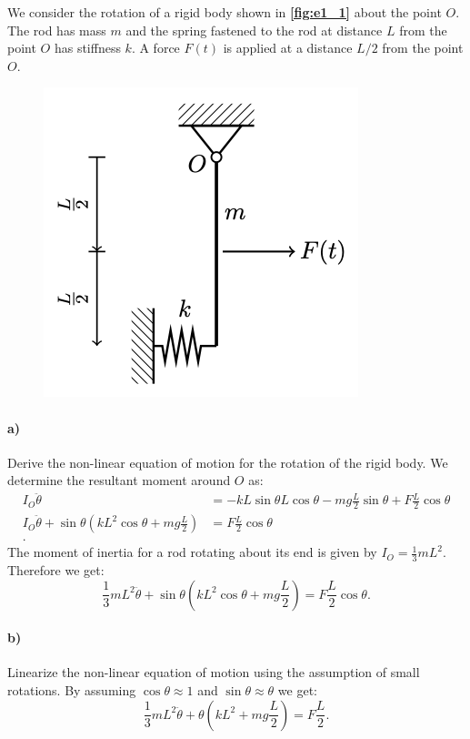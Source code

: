 
We consider the rotation of a rigid body shown in \textbf{\autoref{fig:e1_1}} about the point $O$. The rod has mass $m$ and the spring fastened to the rod at distance $L$ from the point $O$ has stiffness $k$. A force $F(t)$ is applied at a distance $L/2$ from the point $O$.

\begin{figure} [ht]
  \centering
  \includegraphics[width=0.35\linewidth]{./figures/e1_1.png}
  \caption{}
  \label{fig:e1_1}
\end{figure}

\paragraph{a)} Derive the non-linear equation of motion for the rotation of the rigid body.
\bigbreak
We determine the resultant moment around $O$ as:
\begin{align*}
  I_O \ddot{\theta} &= - kL \sin \theta L \cos \theta - mg \frac{L}{2} \sin \theta + F \frac{L}{2} \cos \theta \\
  I_O \ddot{\theta} + \sin \theta \left( kL^2 \cos \theta + mg \frac{L}{2} \right) &= F \frac{L}{2} \cos \theta  \\
.\end{align*}
The moment of inertia for a rod rotating about its end is given by $I_O = \frac{1}{3} m L^2$. Therefore we get:
\[ 
  \frac{1}{3} m L^2 \ddot{\theta} + \sin \theta \left( k L^2 \cos \theta + mg \frac{L}{2} \right) = F \frac{L}{2} \cos \theta
.\]


\paragraph{b)} Linearize the non-linear equation of motion using the assumption of small rotations.
\bigbreak
By assuming $\cos \theta \approx 1$ and $\sin \theta \approx \theta$ we get:
\[ 
  \frac{1}{3} m L^2 \ddot{\theta} + \theta \left( k L^2 + mg \frac{L}{2} \right) = F \frac{L}{2}
.\]


